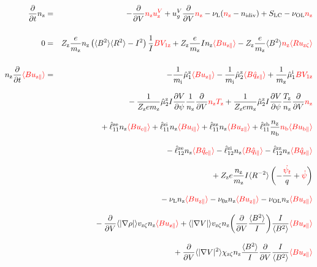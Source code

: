 \documentclass[11pt]{article}
\def\r#1{{\rm#1}}
\def\aves#1{\langle#1\rangle}
\def\dd#1#2{\frac{\partial #1}{\partial #2}}
\def\para{\parallel}
\def\ddV{\frac{\partial}{\partial V}}
\def\ddt{\frac{\partial}{\partial t}}
\def\psid{\dot{\psi}}
\def\psit{\psi_t}
\def\psitd{\dot{\psit}}
\def\mi{m_\r{i}}
\def\mz{m_\r{z}}
\def\nz{n_\r{z}}
\def\nb{n_\r{b}}
\def\Tz{T_\r{z}}
\def\Zz{Z_\r{z}}
\def\uzt#1{u_{\r{#1}\zeta}}
\def\upara#1{u_{\r{#1}\para}}
\def\qhatpara#1{\hat{q}_{\r{#1}\para}}
\def\uV#1{u_\r{#1}^V}
\def\ugV{u_{g}^V}
\def\chis#1{\chi_\r{#1}}
\def\nun#1{\nu_\r{0#1}}
\def\ndiv#1{n_\r{#1div}}
\def\bri{\aves{B^2}\aves{R^2} - I^2}
\def\nuL{\nu_\r{L}}
\def\nuOL{\nu_\r{OL}}
\def\red#1{\textcolor{red}{#1}}
\begin{document}
\clearpage

%
\begin{eqnarray}
  \ddt \nz &=&
%
  - \ddV \red{\nz\uV{z}}
%
  + \ugV \ddV \red{\nz}
%
  - \nuL (\red{\nz} - \ndiv{i}) 
%
  + S_\r{LC}
%
  - \nuOL \red{\nz}
%
\\[5mm]
  0 &=&
%
    \Zz \frac{e}{\mz} \nz \left( \bri \right) \frac{1}{I} \red{B V_{1\r{z}}}
%
  + \Zz \frac{e}{\mz} I \nz \red{\aves{B\upara{z}}}
%
  - \Zz \frac{e}{\mz} \aves{B^2} \red{\nz \aves{R\uzt{z}}}
\\[5mm]
  \nz \ddt \red{\aves{B \upara{z}}} &=&
%
  - \frac{1}{\mi} \hat{\mu}_1^\r{z} \red{\aves{B \upara{z}}}
  - \frac{1}{\mi} \hat{\mu}_2^\r{z} \red{\aves{B \qhatpara{z}}}
%
  + \frac{1}{\mz} \hat{\mu}_1^\r{i} \red{B V_{1\r{z}}} 
\nonumber\\[3mm]&&{}
%
  - \frac{1}{\Zz e\mz} \hat{\mu}_2^\r{z} I \dd{V}{\psi} \frac{1}{\nz}
  \ddV \red{\nz\Tz}
  + \frac{1}{\Zz e\mz} \hat{\mu}_2^\r{z} I \dd{V}{\psi} \frac{\Tz}{\nz}
  \ddV \red{\nz}
\nonumber\\[3mm]&&{}
%
  + \hat{\ell}_{11}^{\r{ze}} \nz \red{\aves{B \upara{e}}}
  + \hat{\ell}_{11}^{\r{zi}} \nz \red{\aves{B \upara{i}}}
  + \hat{\ell}_{11}^{\r{zz}} \nz \red{\aves{B \upara{z}}}
  + \hat{\ell}_{11}^{\r{zb}} \frac{\nz}{\nb} \red{\nb \aves{B \upara{b}}}
\nonumber\\[3mm]&&{}
%
  - \hat{\ell}_{12}^{\r{ze}} \nz \red{\aves{B \qhatpara{e}}}
  - \hat{\ell}_{12}^{\r{zi}} \nz \red{\aves{B \qhatpara{i}}}
  - \hat{\ell}_{12}^{\r{zz}} \nz \red{\aves{B \qhatpara{z}}}
\nonumber\\[3mm]&&{}
%
  + \Zz e \frac{\nz}{\mz} I \aves{R^{-2}} \left( - \frac{\red{\psitd}}{q} + \red{\psid} \right)
%
%
\nonumber\\[3mm]&&{}
%
  - \nuL  \nz \red{\aves{B \upara{z}}}
%
  - \nun{z} \nz \red{\aves{B \upara{z}}}
%
  - \nuOL \nz \red{\aves{B \upara{z}}}
\nonumber\\[3mm]&&{}
%
  - \ddV \aves{|\nabla \rho|} v_{\r{z}\zeta} \nz \red{\aves{B \upara{z}}}
%
  + \aves{|\nabla V|} v_{\r{z}\zeta} \nz 
  \biggl(\ddV \frac{\aves{B^2}}{I} \biggl) \frac{I}{\aves{B^2}} \red{\aves{B \upara{z}}}
\nonumber\\[3mm]&&{}
%
  + \ddV \aves{|\nabla V|^2} \chis{z\zeta} \nz
  \frac{\aves{B^2}}{I} \ddV \frac{I}{\aves{B^2}} \red{\aves{B \upara{z}}}

\end{eqnarray}
\end{document}
